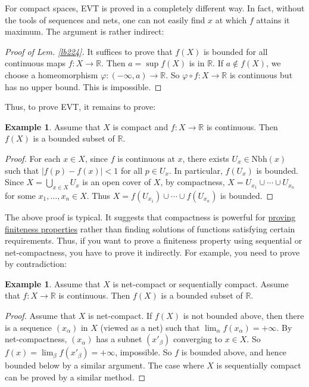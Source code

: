 \documentclass[12pt,b5paper,notitlepage]{article}
\theoremstyle{definition}
\newtheorem{eg}[df]{Example}
\theoremstyle{plain}
\newcommand{\Rbb}{\mathbb R}
\newcommand{\Nbh}{\mathrm{Nbh}}
\numberwithin{equation}{section}
\begin{document}
For compact spaces, EVT is proved in a completely different way. In fact, without the tools of sequences and nets, one can not easily find $x$ at which $f$ attains it maximum. The argument is rather indirect:

\begin{proof}[Proof of Lem. \ref{lb224}]
It suffices to prove that $f(X)$ is bounded for all continuous maps $f:X\rightarrow\Rbb$. Then $a=\sup f(X)$ is in $\Rbb$. If $a\notin f(X)$, we choose a homeomorphism $\varphi:(-\infty,a)\rightarrow\Rbb$. So $\varphi\circ f:X\rightarrow\Rbb$ is  continuous but has no upper bound. This is impossible.
\end{proof}

Thus, to prove EVT, it remains to prove:
\begin{eg}\label{lb227}
Assume that $X$ is compact and $f:X\rightarrow\Rbb$ is continuous. Then $f(X)$ is a bounded subset of $\Rbb$.
\end{eg}

\begin{proof}
For each $x\in X$, since $f$ is continuous at $x$, there exists $U_x\in\Nbh(x)$ such that $|f(p)-f(x)|<1$ for all $p\in U_x$. In particular, $f(U_x)$ is bounded. Since $X=\bigcup_{x\in X}U_x$ is an open cover of $X$, by compactness, $X=U_{x_1}\cup\cdots\cup U_{x_n}$ for some $x_1,\dots,x_n\in X$. Thus $X= f(U_{x_1})\cup\cdots\cup f(U_{x_n})$ is bounded.
\end{proof}



The above proof is typical. It suggests that compactness is powerful for \uline{proving finiteness properties} rather than finding solutions of functions satisfying certain requirements. Thus, if you want to prove a finiteness property using sequential or net-compactness, you have to prove it indirectly. For example, you need to prove by contradiction:

\begin{eg}
Assume that $X$ is net-compact or sequentially compact. Assume that $f:X\rightarrow\Rbb$ is continuous. Then $f(X)$ is a bounded subset of $\Rbb$.
\end{eg}


\begin{proof}
Assume that $X$ is net-compact. If $f(X)$ is not bounded above, then there is a sequence $(x_\alpha)$ in $X$ (viewed as a net)  such that $\lim_\alpha f(x_\alpha)=+\infty$. By net-compactness, $(x_\alpha)$ has a subnet $(x'_\beta)$ converging to $x\in X$. So $f(x)=\lim_\beta f(x'_\beta)=+\infty$, impossible. So $f$ is bounded above, and hence bounded below by a similar argument. The case where $X$ is sequentially compact can be proved by a similar method.
\end{proof}
\end{document}

